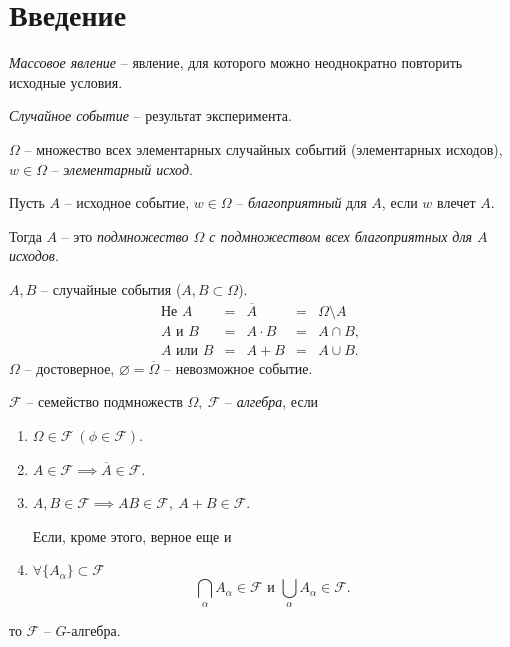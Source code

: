 \setcounter{chapter}{-1}
\chapter{Введение}



\emph{Массовое явление} -- явление, для которого можно неоднократно повторить исходные условия.

\emph{Случайное событие} -- результат эксперимента.
\begin{figure}[H]
  \centering
  \label{fig:fig-1}
\end{figure}

$\Omega$ -- множество всех элементарных случайных событий (элементарных исходов), $w \in \Omega$ -- \emph{элементарный исход}.

\begin{definition}
  Пусть $A$ -- исходное событие, $w \in \Omega$ -- \emph{благоприятный} для $A$, если $w$ влечет $A$.

  Тогда $A$ -- это \emph{подмножество $\Omega$ с подмножеством всех благоприятных для $A$ исходов}.
\end{definition}

\begin{note}
  $A,B$ -- случайные события ($A,B \subset \Omega$).
  \[
    \begin{array}{ccccc}
      \text{Не } A & = & \overline{A} & = & \Omega \setminus A \\
      A \text{ и } B & = & A \cdot B & = & A \cap B, \\
      A \text{ или } B & = & A + B & = & A \cup B.
    \end{array} 
  \]
  $\Omega$ -- достоверное, $\varnothing = \overline{\Omega}$ -- невозможное событие.
\end{note}

\begin{definition}[Алгебра]
  $\mathcal{F}$ -- семейство подмножеств $\Omega, \ \mathcal{F}$ -- \emph{алгебра}, если 
  \begin{enumerate}
    \item $\Omega \in \mathcal{F} \ (\phi \in \mathcal{F})$.
    \item $A \in \mathcal{F}\implies \overline{A} \in \mathcal{F}$.
    \item $A,B \in \mathcal{F}\implies AB \in \mathcal{F}, \ A+B\in \mathcal{F}$.

    Если, кроме этого, верное еще и
    \item $\forall \{A_{\alpha}\}\subset \mathcal{F}$
    \[
      \bigcap_{\alpha}A_{\alpha}\in \mathcal{F} \text{ и } \bigcup_{\alpha}A_{\alpha}\in \mathcal{F}.
    \]
  \end{enumerate}
  то $\mathcal{F}$ -- $G$-алгебра.
\end{definition}

